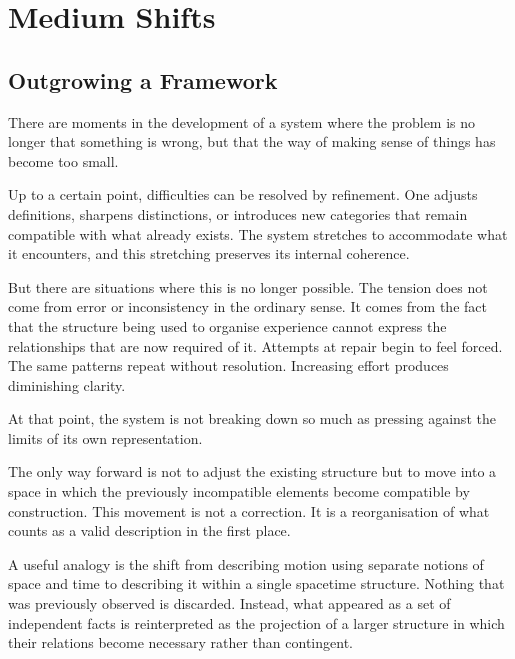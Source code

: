 \documentclass[11pt,openany]{book}
\begin{document}

\chapter{Medium Shifts}
\label{ch:medium-shifts}

\section*{ Outgrowing a Framework}

There are moments in the development of a system where the
problem is no longer that something is wrong, but that the
way of making sense of things has become too small.

Up to a certain point, difficulties can be resolved by
refinement.  One adjusts definitions, sharpens distinctions,
or introduces new categories that remain compatible with
what already exists.  The system stretches to accommodate
what it encounters, and this stretching preserves its
internal coherence.

But there are situations where this is no longer possible.
The tension does not come from error or inconsistency in the
ordinary sense.  It comes from the fact that the structure
being used to organise experience cannot express the
relationships that are now required of it.  Attempts at
repair begin to feel forced.  The same patterns repeat
without resolution.  Increasing effort produces diminishing
clarity.

At that point, the system is not breaking down so much as
pressing against the limits of its own representation.

The only way forward is not to adjust the existing structure
but to move into a space in which the previously incompatible
elements become compatible by construction.  This movement
is not a correction.  It is a reorganisation of what counts
as a valid description in the first place.

A useful analogy is the shift from describing motion using
separate notions of space and time to describing it within a
single spacetime structure.  Nothing that was previously
observed is discarded.  Instead, what appeared as a set of
independent facts is reinterpreted as the projection of a
larger structure in which their relations become necessary
rather than contingent.
\end{document}
